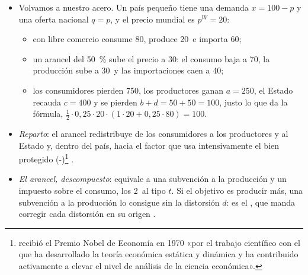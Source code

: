 \documentclass[11pt]{article}
\begin{document}
\begin{itemize}
\begin{equation}
  \mathrm{PIE}=b+d\approx\tfrac12\,t^2\,p^W\left(\varepsilon_{q,p}\,q^0+\lvert\varepsilon_{x,p}\rvert\,x^0\right)=\tfrac12\,t^2\,\lvert\varepsilon_{M,p}\rvert\,p^WM^0,
  \end{equation}
  con las elasticidades de la oferta, la demanda y las importaciones en el libre comercio. Depende de 2~cosas:
  \begin{itemize}
  \item (+) de las \emph{elasticidades}: cuanto más responden la oferta y la demanda al precio, mayores son las 2~distorsiones;
  \item (++) de la \emph{cuantía del arancel}, y además con su \emph{cuadrado}: es mejor poner aranceles bajos en muchos productos que muy altos en unos pocos.
  \end{itemize}
\item Volvamos a nuestro acero. Un país pequeño tiene una demanda $x=100-p$ y una oferta nacional $q=p$, y el precio mundial es $p^W=20$:
  \begin{itemize}
  \item con libre comercio consume 80, produce 20~e importa 60;
  \item un arancel del 50~\% sube el precio a 30: el consumo baja a 70, la producción sube a 30~y las importaciones caen a 40;
  \item los consumidores pierden 750, los productores ganan $a=250$, el Estado recauda $c=400$ y se pierden $b+d=50+50=100$, justo lo que da la fórmula, $\tfrac12\cdot0{,}25\cdot20\cdot(1\cdot20+0{,}25\cdot80)=100$.
  \end{itemize}
\item \emph{Reparto}: el arancel redistribuye de los consumidores a los productores y al Estado y, dentro del país, hacia el factor que usa intensivamente el bien protegido (-)\footnote{ recibió el Premio Nobel de Economía en 1970 «por el trabajo científico con el que ha desarrollado la teoría económica estática y dinámica y ha contribuido activamente a elevar el nivel de análisis de la ciencia económica»\nocite{Nobel1970Samuelson}.} .
\item \emph{El arancel, descompuesto}: equivale a una subvención a la producción y un impuesto sobre el consumo, los 2~al tipo $t$\nocite{Corden1971Theory}. Si el objetivo es producir más, una subvención a la producción lo consigue sin la distorsión $d$: es el , que manda corregir cada distorsión en su origen\nocite{BhagwatiRamaswami1963Domestic} .

\end{itemize}
\end{document}
